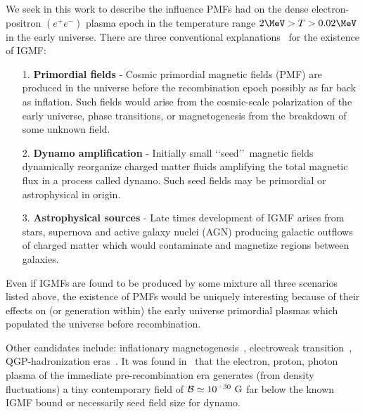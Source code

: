 We seek in this work to describe the influence PMFs had on the dense electron-positron $(e^{+}e^{-})$ plasma epoch in the temperature range $2\MeV>T>0.02\MeV$ in the early universe. There are three conventional explanations~\cite{batista2021gammaray} for the existence of IGMF:
\begin{itemize}
    \item [1.] \textbf{Primordial fields} - Cosmic primordial magnetic fields (PMF) are produced in the universe before the recombination epoch possibly as far back as inflation. Such fields would arise from the cosmic-scale polarization of the early universe, phase transitions, or magnetogenesis from the breakdown of some unknown field.
    \item [2.] \textbf{Dynamo amplification} - Initially small \lq\lq seed\rq\rq\ magnetic fields dynamically reorganize charged matter fluids amplifying the total magnetic flux in a process called dynamo. Such seed fields may be primordial or astrophysical in origin.
    \item [3.] \textbf{Astrophysical sources} - Late times development of IGMF arises from stars, supernova and active galaxy nuclei (AGN) producing galactic outflows of charged matter which would contaminate and magnetize regions between galaxies.
\end{itemize}
Even if IGMFs are found to be produced by some mixture all three scenarios listed above, the existence of PMFs would be uniquely interesting because of their effects on (or generation within) the early universe primordial plasmas which populated the universe before recombination.

Other candidates include: inflationary magnetogenesis~\cite{subramanian2009magnetic}, electroweak transition~\cite{vachaspati2020progress}, QGP-hadronization eras~\cite{bali2011qcd}. It was found in~\cite{gopal2004generation} that the electron, proton, photon plasma of the immediate pre-recombination era generates (from density fluctuations) a tiny contemporary field of ${\cal B}\simeq10^{-30}{\rm\ G}$ far below the known IGMF bound or necessarily seed field size for dynamo.


